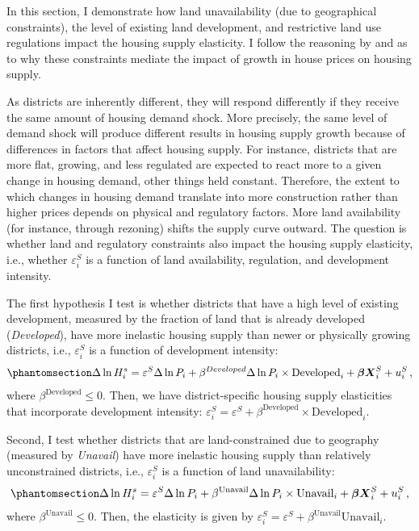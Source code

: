 \documentclass[
  12pt,
]{article}
\begin{document}
In this section, I demonstrate how land unavailability (due to
geographical constraints), the level of existing land development, and
restrictive land use regulations impact the housing supply elasticity. I
follow the reasoning by \citet{saiz_2010} and \citet{baum-snow_han_2019}
as to why these constraints mediate the impact of growth in house prices
on housing supply.

As districts are inherently different, they will respond differently if
they receive the same amount of housing demand shock. More precisely,
the same level of demand shock will produce different results in housing
supply growth because of differences in factors that affect housing
supply. For instance, districts that are more flat, growing, and less
regulated are expected to react more to a given change in housing
demand, other things held constant. Therefore, the extent to which
changes in housing demand translate into more construction rather than
higher prices depends on physical and regulatory factors. More land
availability (for instance, through rezoning) shifts the supply curve
outward. The question is whether land and regulatory constraints also
impact the housing supply elasticity, i.e., whether \(\varepsilon^S_i\)
is a function of land availability, regulation, and development
intensity.

The first hypothesis I test is whether districts that have a high level
of existing development, measured by the fraction of land that is
already developed (\emph{Developed}), have more inelastic housing supply
than newer or physically growing districts, i.e., \(\varepsilon^S_i\) is
a function of development intensity:
\begin{equation}\phantomsection\label{eq-case-2}{
\Delta\ln H_i^s = \varepsilon^S\Delta\ln P_i + \beta^{Developed} \Delta \ln P_i\times\text{Developed}_i + \boldsymbol{\beta}\boldsymbol{X}_i^S + u^S_i\,,
}\end{equation} where \(\beta^{\text{Developed}} \le 0\). Then, we have
district-specific housing supply elasticities that incorporate
development intensity:
\(\varepsilon^S_i = \varepsilon^S + \beta^{\text{Developed}}\times\text{Developed}_i\).

Second, I test whether districts that are land-constrained due to
geography (measured by \emph{Unavail}) have more inelastic housing
supply than relatively unconstrained districts, i.e.,
\(\varepsilon^S_i\) is a function of land unavailability:
\begin{equation}\phantomsection\label{eq-case-3}{ 
\Delta\ln H_i^s = \varepsilon^S\Delta\ln P_i + \beta^{\text{Unavail}} \Delta \ln P_i\times\text{Unavail}_i + \boldsymbol{\beta}\boldsymbol{X}_i^S + u^S_i\,,
}\end{equation} where \(\beta^{\text{Unavail}} \le 0\). Then, the
elasticity is given by
\(\varepsilon^S_i = \varepsilon^S + \beta^{\text{Unavail}}\text{Unavail}_i\).
\end{document}
